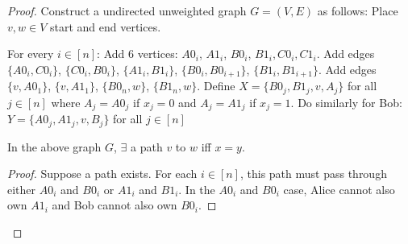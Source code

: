 \begin{proof}
Construct a undirected unweighted graph $G = (V,E)$ as follows: Place $v,w \in V$ start and end vertices. 

For every $i \in [n]$: Add 6 vertices: $A0_i$, $A1_i$, $B0_i$, $B1_i, C0_i, C1_i$. Add edges $\{A0_i, C0_i\}$, $\{C0_i, B0_i\}$, $\{A1_i, B1_i\}$, $\{B0_i, B0_{i+1}\}$, $\{B1_i, B1_{i+1}\}$. Add edges $\{v, A0_1\}$, $\{v, A1_1\}$, $\{B0_n, w\}$, $\{B1_n, w\}$. Define $X = \{ B0_j, B1_j, v, A_j \}$ for all $j \in [n]$ where $A_j = A0_j$ if $x_j = 0$ and $A_j = A1_j$ if $x_j = 1$. Do similarly for Bob: $Y = \{ A0_j, A1_j, v, B_j \}$ for all $j \in [n]$

\begin{lemma}
In the above graph $G$, $\exists$ a path $v$ to $w$ iff $x = y$.
\end{lemma}

\begin{proof}
Suppose a path exists. For each $i \in [n]$, this path must pass through either $A0_i$ and $B0_i$ or $A1_i$ and $B1_i$. In the $A0_i$ and $B0_i$ case, Alice cannot also own $A1_i$ and Bob cannot also own $B0_i$. 
\end{proof}
\end{proof}

